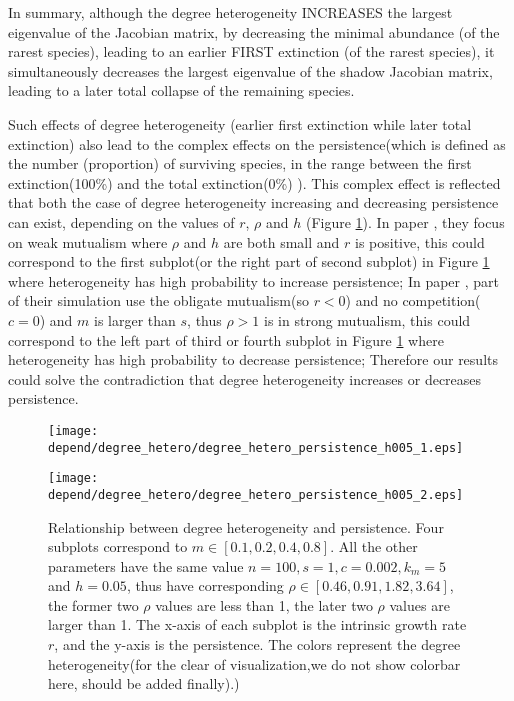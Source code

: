 \documentclass[a4paper,fleqn,12pt]{article}
\begin{document}
In summary, although the degree heterogeneity INCREASES the largest eigenvalue of the Jacobian matrix, by decreasing the minimal abundance (of the rarest species), leading to an earlier FIRST extinction (of the rarest species), it simultaneously decreases the largest eigenvalue of the shadow Jacobian matrix, leading to a later total collapse of the remaining species.

Such effects of degree heterogeneity (earlier first extinction while later total extinction) also lead to the complex effects on the persistence(which is defined as the number (proportion) of surviving species, in the range between the first extinction(100\%) and the total extinction(0\%) ).
This complex effect is reflected that both the case of degree heterogeneity increasing and decreasing persistence can exist,
depending on the values of $r$, $\rho$ and $h$ (Figure \ref{fig:degree-hetero-persistence}).
In paper \cite{bastolla_architecture_2009}, they focus on weak mutualism where $\rho$ and $h$ are both small and $r$ is positive, this could correspond to the first subplot(or the right part of second subplot) in Figure \ref{fig:degree-hetero-persistence} where heterogeneity has high probability to increase persistence;
In paper \cite{james_disentangling_2012}, part of their simulation use the  obligate mutualism(so $r<0$) and no competition($c=0$) and $m$ is larger than $s$, thus $\rho>1$ is in strong mutualism, 
this could correspond to the left part of third or fourth subplot in Figure \ref{fig:degree-hetero-persistence} where heterogeneity has high probability to decrease persistence; 
Therefore our results could solve the contradiction that degree heterogeneity increases \cite{bastolla_architecture_2009} or decreases \cite{james_disentangling_2012,thebault_stability_2010} persistence. 

\begin{figure}[htbp]
\begin{minipage}{0.9\linewidth}
  \texttt{[image: depend/degree\_hetero/degree\_hetero\_persistence\_h005\_1.eps]}
\end{minipage}
\vfill
\begin{minipage}{0.9\linewidth}
  \texttt{[image: depend/degree\_hetero/degree\_hetero\_persistence\_h005\_2.eps]}
\end{minipage}
\caption{Relationship between degree heterogeneity and persistence.
Four subplots correspond to $m \in [0.1,0.2,0.4,0.8]$. All the other parameters have the same value $n = 100, s = 1, c = 0.002, k_m = 5$ and $h = 0.05$, thus have corresponding $\rho \in [0.46,0.91,1.82,3.64]$, the former two $\rho$ values are less than 1, the later two $\rho$ values are larger than 1.
The x-axis of each subplot is the intrinsic growth rate $r$, and the y-axis is the persistence. The colors represent the degree heterogeneity({\color{red}for the clear of visualization,we do not show colorbar here, should be added finally}).)}
\label{fig:degree-hetero-persistence}
\end{figure}
\end{document}
